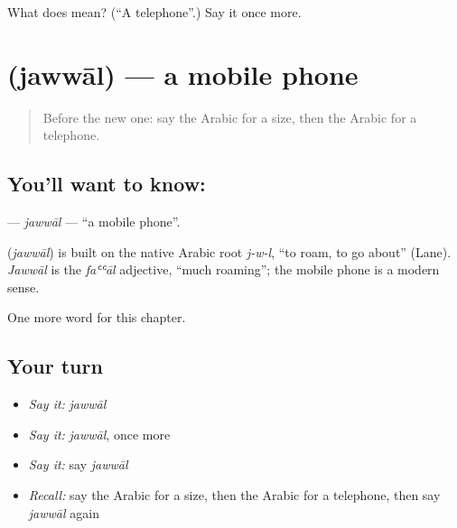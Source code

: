 \begin{tcolorbox}[breakable,colback=teal!4,colframe=teal!35!black,title={Before you move on}]
What does  mean? (\textquotedblleft{}A telephone\textquotedblright{}.) Say it once more.
\end{tcolorbox}
\section[\texorpdfstring{\ar{جوال} (jawwāl)}{جوال (jawwāl)}]{ (jawwāl) — a mobile phone}

\label{lesson:AR-C245-jawwal}



\begin{quote}
Before the new one: say the Arabic for a size, then the Arabic for a telephone.
\end{quote}

\subsection*{You'll want to know: }
\textbf{} — \emph{jawwāl} — \textquotedblleft{}a mobile phone\textquotedblright{}.

\begin{cousinweb}
\textbf{} (\emph{jawwāl}) is built on the native Arabic root \emph{j-w-l}, \textquotedblleft{}to roam, to go about\textquotedblright{} (Lane). \emph{Jawwāl} is the \emph{faʿʿāl} adjective, \textquotedblleft{}much roaming\textquotedblright{}; the mobile phone is a modern sense.
\end{cousinweb}

\begin{grammarlens}[title={What you've built}]
One more word for this chapter.
\end{grammarlens}

\subsection*{Your turn}
\begin{itemize}
\raggedright
  \item \emph{Say it:} \emph{jawwāl}
  \item \emph{Say it:} \emph{jawwāl}, once more
  \item \emph{Say it:} say \emph{jawwāl}
  \item \emph{Recall:} say the Arabic for a size, then the Arabic for a telephone, then say \emph{jawwāl} again
\end{itemize}

